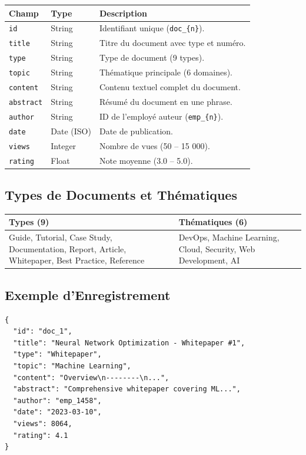\documentclass[12pt,a4paper]{article}
\begin{document}
\begin{longtable}{|p{3.5cm}|p{2.5cm}|p{7.5cm}|}
\hline
\rowcolor{bleu!15}
\textbf{Champ} & \textbf{Type} & \textbf{Description} \\
\hline
\texttt{id} & String & Identifiant unique (\texttt{doc\_\{n\}}). \\
\hline
\texttt{title} & String & Titre du document avec type et numéro. \\
\hline
\texttt{type} & String & Type de document (9 types). \\
\hline
\texttt{topic} & String & Thématique principale (6 domaines). \\
\hline
\texttt{content} & String & Contenu textuel complet du document. \\
\hline
\texttt{abstract} & String & Résumé du document en une phrase. \\
\hline
\texttt{author} & String & ID de l'employé auteur (\texttt{emp\_\{n\}}). \\
\hline
\texttt{date} & Date (ISO) & Date de publication. \\
\hline
\texttt{views} & Integer & Nombre de vues (50 -- 15 000). \\
\hline
\texttt{rating} & Float & Note moyenne (3.0 -- 5.0). \\
\hline
\end{longtable}

\subsection{Types de Documents et Thématiques}

\begin{longtable}{|p{6.5cm}|p{7cm}|}
\hline
\rowcolor{bleu!15}
\textbf{Types (9)} & \textbf{Thématiques (6)} \\
\hline
Guide, Tutorial, Case Study, Documentation, Report, Article, Whitepaper, Best Practice, Reference & DevOps, Machine Learning, Cloud, Security, Web Development, AI \\
\hline
\end{longtable}

\subsection{Exemple d'Enregistrement}

\begin{lstlisting}[language={}]
{
  "id": "doc_1",
  "title": "Neural Network Optimization - Whitepaper #1",
  "type": "Whitepaper",
  "topic": "Machine Learning",
  "content": "Overview\n--------\n...",
  "abstract": "Comprehensive whitepaper covering ML...",
  "author": "emp_1458",
  "date": "2023-03-10",
  "views": 8064,
  "rating": 4.1
}
\end{lstlisting}
\end{document}
